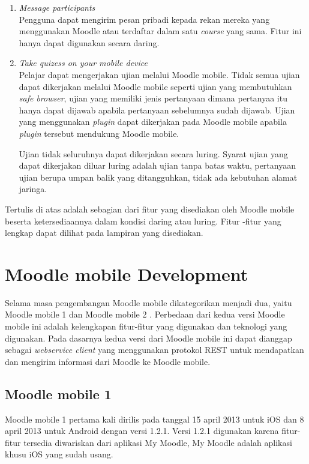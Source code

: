 \begin{enumerate}
		\item \textit{Message participants} \\
			Pengguna dapat mengirim pesan pribadi kepada rekan mereka yang menggunakan Moodle atau terdaftar dalam satu \textit{course} yang sama. Fitur ini hanya dapat digunakan secara daring.
		\item \textit{Take quizess on your mobile device} \\
			Pelajar dapat mengerjakan ujian melalui Moodle mobile. Tidak semua ujian dapat dikerjakan melalui Moodle mobile seperti ujian yang membutuhkan \textit{safe browser}, ujian yang memiliki jenis pertanyaan dimana pertanyaa itu hanya dapat dijawab apabila pertanyaan sebelumnya sudah dijawab. Ujian yang menggunakan \textit{plugin} dapat dikerjakan pada Moodle mobile apabila \textit{plugin} tersebut mendukung Moodle mobile.\cite{moodle:39}
			
			Ujian tidak seluruhnya dapat dikerjakan secara luring. Syarat ujian yang dapat dikerjakan diluar luring adalah ujian tanpa batas waktu, pertanyaan ujian berupa umpan balik yang ditangguhkan, tidak ada kebutuhan alamat jaringa. \cite{moodle:39}
	\end{enumerate}
	
Tertulis di atas adalah sebagian dari fitur yang disediakan oleh Moodle mobile beserta ketersediaannya dalam kondisi daring atau luring. Fitur -fitur yang lengkap dapat dilihat pada lampiran yang disediakan.

\section{Moodle mobile Development}
\label{sec:MoodleAppDev}

Selama masa pengembangan Moodle mobile dikategorikan menjadi dua, yaitu Moodle mobile 1 dan Moodle mobile 2 \cite{moodle:dev}. Perbedaan dari kedua versi Moodle mobile ini adalah kelengkapan fitur-fitur yang digunakan dan teknologi yang digunakan. Pada dasarnya kedua versi dari Moodle mobile ini dapat dianggap sebagai \textit{webservice client} yang menggunakan protokol REST untuk mendapatkan dan mengirim informasi dari Moodle ke Moodle mobile. 

\subsection{Moodle mobile 1}
 Moodle mobile 1 pertama kali dirilis pada tanggal 15 april 2013 untuk iOS dan 8 april 2013 untuk Android dengan versi 1.2.1. Versi 1.2.1 digunakan karena fitur-fitur tersedia diwariskan dari aplikasi My Moodle, My Moodle adalah aplikasi khusu iOS yang sudah usang.\cite{moodle:dev}

